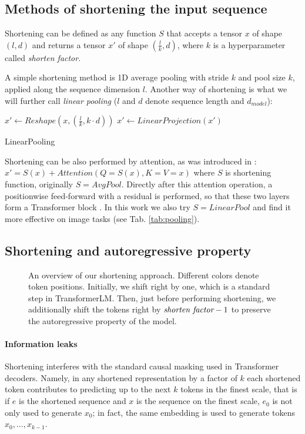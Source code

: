 \documentclass[11pt]{article}
\newcommand{\shf}{\emph{shorten factor}}
\begin{document}
\subsection{Methods of shortening the input sequence}\label{sec:shortening}

Shortening can be defined as any function $S$ that accepts a tensor $x$ of shape $(l, d)$ and returns a tensor $x'$ of shape $(\frac{l}{k}, d)$, where $k$ is a hyperparameter called \shf. 
    
A simple shortening method is 1D average pooling with stride $k$ and pool size $k$, applied along the sequence dimension $l$.
Another way of shortening is what we will further call \emph{linear pooling} ($l$ and $d$ denote sequence length and $d_{model}$):
\begin{algorithm}[H]
\begin{algorithmic}
\STATE $x' \gets Reshape(x, (\frac{l}{k}, k \cdot d))$
\STATE $x' \gets LinearProjection(x')$
\end{algorithmic}
\caption{LinearPooling}
\end{algorithm}

Shortening can be also performed by attention, as was introduced in \cite{dai2020funneltransformer}: $x' = S(x) + Attention(Q = S(x), K = V = x)$ where $S$ is shortening function, originally $S = AvgPool$. Directly after this attention operation, a positionwise feed-forward with a residual is performed, so that these two layers form a Transformer block \cite{vaswani2017attention}. In this work we also try $S = LinearPool$ and find it more effective on image tasks (see Tab. \ref{tab:pooling}).

\subsection{Shortening and autoregressive property}\label{sec:lm}

\begin{figure}
\centering
\centering
\caption{An overview of our shortening approach. Different colors denote token positions. Initially, we shift right by one, which is a standard step in TransformerLM. Then, just before performing shortening, we additionally shift the tokens right by $\emph{shorten factor}-1$ to preserve the autoregressive property of the model.}
\label{fig:shortening}
\end{figure}


\paragraph{Information leaks}
Shortening interferes with the standard causal masking used in Transformer decoders. 
Namely, in any shortened representation by a factor of $k$
each shortened token contributes to predicting up to the next $k$ tokens in the finest scale, 
that is if $e$ is the shortened sequence and $x$ is the sequence on the finest scale, 
$e_0$ is not only used to generate $x_0$; in fact, the same embedding is used to generate tokens $x_0, ..., x_{k-1}$.
\end{document}
